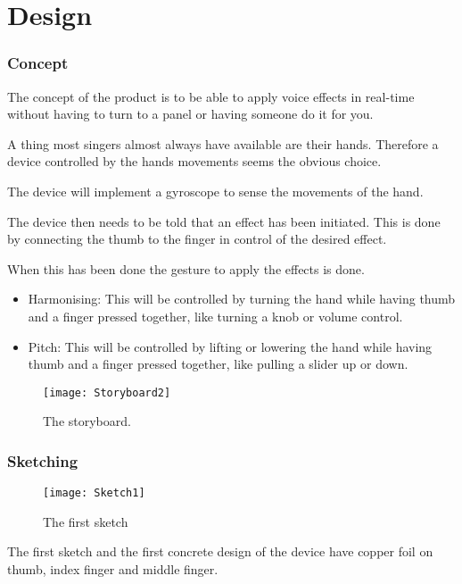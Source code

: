 \chapter{Design}

\subsection{Concept}
The concept of the product is to be able to apply voice effects in real-time without having to turn to a panel or having someone do it for you. 

A thing most singers almost always have available are their hands. Therefore a device controlled by the hands movements seems the obvious choice.

The device will implement a gyroscope to sense the movements of the hand.

The device then needs to be told that an effect has been initiated. This is done by connecting the thumb to the finger in control of the desired effect.

When this has been done the gesture to apply the effects is done. 

\begin{itemize}
\item Harmonising: This will be controlled by turning the hand while having thumb and a finger pressed together, like turning a knob or volume control.
\item Pitch: This will be controlled by lifting or lowering the hand while having thumb and a finger pressed together, like pulling a slider up or down.
\end{itemize}

\begin{figure}[!h]
\centering
\texttt{[image: Storyboard2]}
\caption{The storyboard.} \label{Storyboard1}
\end{figure}


\subsection{Sketching}
\begin{figure}[!h]
\centering
\texttt{[image: Sketch1]}
\caption{The first sketch} \label{Sketch1}
\end{figure}

The first sketch and the first concrete design of the device have copper foil on thumb, index finger and middle finger. 

